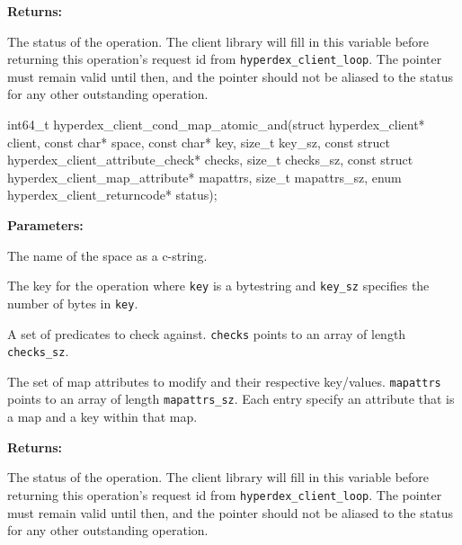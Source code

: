 \noindent\textbf{Returns:}
\begin{description}[labelindent=\widthof{{\texttt{status}}},leftmargin=*,noitemsep,nolistsep,align=right]
\item[\texttt{status}] The status of the operation.  The client library will fill in this variable before returning this operation's request id from \texttt{hyperdex\_client\_loop}.  The pointer must remain valid until then, and the pointer should not be aliased to the status for any other outstanding operation.
\end{description}

\funcsep
{}
\begin{ccode}
int64_t hyperdex_client_cond_map_atomic_and(struct hyperdex_client* client,
                const char* space,
                const char* key, size_t key_sz,
                const struct hyperdex_client_attribute_check* checks, size_t checks_sz,
                const struct hyperdex_client_map_attribute* mapattrs, size_t mapattrs_sz,
                enum hyperdex_client_returncode* status);
\end{ccode}
\funcdesc 

\noindent\textbf{Parameters:}
\begin{description}[labelindent=\widthof{{\texttt{mapattrs}, \texttt{mapattrs\_sz}}},leftmargin=*,noitemsep,nolistsep,align=right]
\item[\texttt{space}] The name of the space as a c-string.
\item[\texttt{key}, \texttt{key\_sz}] The key for the operation where \texttt{key} is a bytestring and \texttt{key\_sz} specifies the number of bytes in \texttt{key}.
\item[\texttt{checks}, \texttt{checks\_sz}] A set of predicates to check against.  \texttt{checks} points to an array of length \texttt{checks\_sz}.
\item[\texttt{mapattrs}, \texttt{mapattrs\_sz}] The set of map attributes to modify and their respective key/values.  \texttt{mapattrs} points to an array of length \texttt{mapattrs\_sz}.  Each entry specify an attribute that is a map and a key within that map.
\end{description}

\noindent\textbf{Returns:}
\begin{description}[labelindent=\widthof{{\texttt{status}}},leftmargin=*,noitemsep,nolistsep,align=right]
\item[\texttt{status}] The status of the operation.  The client library will fill in this variable before returning this operation's request id from \texttt{hyperdex\_client\_loop}.  The pointer must remain valid until then, and the pointer should not be aliased to the status for any other outstanding operation.
\end{description}

